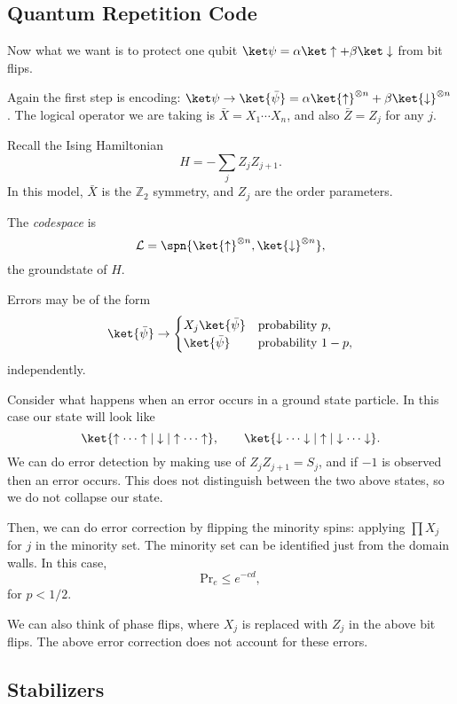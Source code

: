 \documentclass[12pt]{article}
\begin{document}
\subsection{Quantum Repetition Code}%
\label{sub:qrc}

Now what we want is to protect one qubit $\ket \psi = \alpha \ket \uparrow + \beta \ket \downarrow$ from bit flips.

Again the first step is encoding: $\ket \psi \to \ket{\bar \psi} = \alpha \ket{\uparrow}^{\otimes n} + \beta \ket{\downarrow}^{\otimes n}$. The logical operator we are taking is $\bar X = X_1 \cdots X_n$, and also $\bar Z = Z_j$ for any $j$.

Recall the Ising Hamiltonian
\[
H = - \sum_j Z_j Z_{j + 1}.
\]
In this model, $\bar X$ is the $\mathbb{Z}_2$ symmetry, and $Z_j$ are the order parameters.

The \emph{codespace} is
\[
\mathcal{L} = \spn \{ \ket{\uparrow}^{\otimes n}, \ket{\downarrow}^{\otimes n}\},
\]
the groundstate of $H$.

Errors may be of the form
\[
	\ket{\bar \psi} \to
	\begin{cases}
		X_j \ket{\bar \psi} & \text{probability } p, \\
		\ket{\bar \psi} & \text{probability } 1 - p,
	\end{cases}
\]
independently.


Consider what happens when an error occurs in a ground state particle. In this case our state will look like
\[
	\ket{\uparrow \cdots \uparrow | \downarrow | \uparrow \cdots \uparrow}, \qquad \ket{\downarrow \cdots \downarrow | \uparrow | \downarrow \cdots \downarrow}.
\]
We can do error detection by making use of $Z_j Z_{j+1} = S_j$, and if $-1$ is observed then an error occurs. This does not distinguish between the two above states, so we do not collapse our state.

Then, we can do error correction by flipping the minority spins: applying $\prod X_j$ for $j$ in the minority set. The minority set can be identified just from the domain walls. In this case,
\[
\mathrm{Pr}_e \leq e^{-c d},
\]
for $p < 1/2$.

We can also think of phase flips, where $X_j$ is replaced with $Z_j$ in the above bit flips. The above error correction does not account for these errors.

\subsection{Stabilizers}%
\label{sub:stab}
\end{document}
